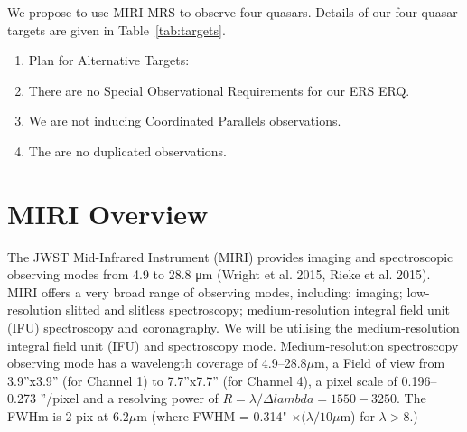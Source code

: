 
\smallskip \smallskip
\noindent
We propose to use MIRI MRS to observe four quasars. Details of our 
four quasar targets are given in Table~\ref{tab:targets}. 

\smallskip \smallskip
\noindent


\begin{enumerate}[label=\alph*]
    \item{Plan for Alternative Targets: }
      
    \item{There are no Special Observational Requirements for our ERS ERQ.} 

    \item{We are not inducing Coordinated Parallels observations.}

    \item{The are no duplicated observations.} 
\end{enumerate}

\section{MIRI Overview}
The JWST Mid-Infrared Instrument (MIRI) provides imaging and
spectroscopic observing modes from 4.9 to 28.8 μm (Wright et al. 2015,
Rieke et al. 2015). MIRI offers a very broad range of observing modes,
including: imaging; low-resolution slitted and slitless spectroscopy;
medium-resolution integral field unit (IFU) spectroscopy and
coronagraphy.  We will be utilising the medium-resolution integral
field unit (IFU) and spectroscopy mode.
Medium-resolution spectroscopy observing mode has a wavelength 
coverage of 4.9–28.8$\mu$m, a Field of view from 3.9''x3.9'' (for Channel 1) 
to 7.7''x7.7'' (for Channel 4), a pixel scale of 0.196–0.273 ''/pixel and 
a resolving power of $R=\lambda / \Delta lambda = 1550-3250$. 
The FWHm is 2 pix at 6.2$\mu$m (where FWHM = 0.314" $\times (\lambda / 10 \mu$m) 
for $\lambda  > 8$\mum.) 


